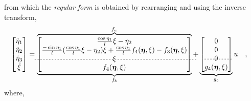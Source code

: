 %
from which the \textit{regular form} is obtained by rearranging and using the inverse transform,
\begin{align}
\begin{bmatrix}
  \dot{\eta}_1   \\
  \dot{\eta}_2   \\
  \dot{\eta}_3   \\  %
  \dot{\xi}
  \end{bmatrix} 
  &=
  \overbrace{
    \underbrace{
      \begin{bmatrix}
      \frac{\cos \eta_1}{l} \xi - \eta_2    \\
      \frac{-\sin \eta_1}{l} (\frac{\cos \eta_1}{l} \xi - \eta_2) \xi + \frac{\cos \eta_1}{l} f_4(\vec{\eta},\xi) - f_3(\vec{\eta},\xi) \\
      \xi    \\ %
      \begin{picture} (0,0)(0,0) \multiput(-95,14)(4,0){57}{\line(2,0){2}} \end{picture}
      f_4(\vec{\eta},\xi) 
      \end{bmatrix}
    }_{f_b} }^{f_a}
  +
  \underbrace{
    \begin{bmatrix}
    0    \\
    0    \\
    0    \\  %
    \begin{picture} (0,0)(0,0) \multiput(0,14)(4,0){10}{\line(2,0){2}} \end{picture}
    g_4(\vec{\eta},\xi)
    \end{bmatrix}
  }_{g_b} u  \ \ \ ,
  \label{eq:regularFormMatrix}
\end{align}
where,
\begingroup\makeatletter\def\f@size{10}\check@mathfonts
\def\maketag@@@#1{\hbox{\m@th\normalsize\normalfont#1}}%
